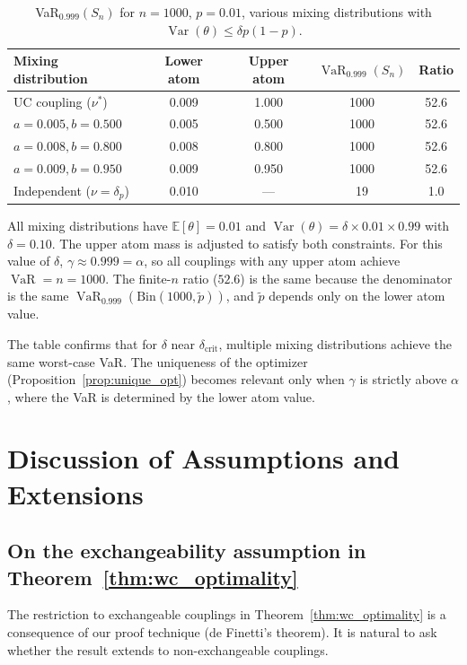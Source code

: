 \documentclass[11pt]{article}
\theoremstyle{definition}
\newcommand{\E}{\mathbb{E}}
\newcommand{\Var}{\operatorname{Var}}
\newcommand{\VaR}{\operatorname{VaR}}
\newcommand{\1}{\mathbf{1}}
\begin{document}
\begin{table}[h]
\centering
\caption{VaR$_{0.999}(S_n)$ for $n = 1000$, $p = 0.01$, various mixing distributions with $\Var(\theta) \leq \delta p(1-p)$.}
\label{tab:mc_optimality}
\begin{tabular}{lcccc}
\toprule
Mixing distribution & Lower atom & Upper atom & $\VaR_{0.999}(S_n)$ & Ratio \\
\midrule
UC coupling ($\nu^*$) & 0.009 & 1.000 & 1000 & 52.6 \\
$a = 0.005, b = 0.500$ & 0.005 & 0.500 & 1000 & 52.6 \\
$a = 0.008, b = 0.800$ & 0.008 & 0.800 & 1000 & 52.6 \\
$a = 0.009, b = 0.950$ & 0.009 & 0.950 & 1000 & 52.6 \\
Independent ($\nu = \delta_p$) & 0.010 & --- & 19 & 1.0 \\
\bottomrule
\end{tabular}
\begin{flushleft}
\small All mixing distributions have $\E[\theta] = 0.01$ and $\Var(\theta) = \delta \times 0.01 \times 0.99$ with $\delta = 0.10$. The upper atom mass is adjusted to satisfy both constraints. For this value of $\delta$, $\gamma \approx 0.999 = \alpha$, so all couplings with any upper atom achieve $\VaR = n = 1000$. The finite-$n$ ratio ($52.6$) is the same because the denominator is the same $\VaR_{0.999}(\mathrm{Bin}(1000, \tilde{p}))$, and $\tilde{p}$ depends only on the lower atom value.
\end{flushleft}
\end{table}

The table confirms that for $\delta$ near $\delta_{\mathrm{crit}}$, multiple mixing distributions achieve the same worst-case VaR. The uniqueness of the optimizer (Proposition~\ref{prop:unique_opt}) becomes relevant only when $\gamma$ is strictly above $\alpha$, where the VaR is determined by the lower atom value.

\section{Discussion of Assumptions and Extensions}\label{app:discussion}

\subsection{On the exchangeability assumption in Theorem~\ref{thm:wc_optimality}}

The restriction to exchangeable couplings in Theorem~\ref{thm:wc_optimality} is a consequence of our proof technique (de Finetti's theorem). It is natural to ask whether the result extends to non-exchangeable couplings.
\end{document}
